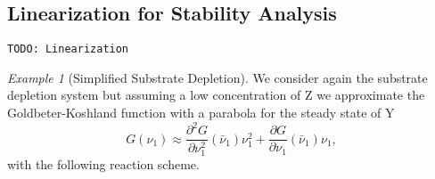 \documentclass[a4paper]{article}
\newcommand{\todo}[1]{\texttt{TODO: #1}}
\theoremstyle{plain}
\theoremstyle{definition}
\theoremstyle{remark}
\newtheorem*{example}{Example}
\begin{document}
\subsection{Linearization for Stability Analysis}

\todo{Linearization}

\begin{example}[Simplified Substrate Depletion]
  We consider again the substrate depletion system but assuming a low
  concentration of Z we approximate the Goldbeter-Koshland
  function with a parabola for the steady state of Y
  \[
    G(\nu_1)
    \approx 
    \frac{\partial^2 G}{\partial \nu_1^2}(\bar{\nu}_1) \nu_1^2 
      + \frac{\partial G}{\partial \nu_1}(\bar{\nu}_1) \nu_1,
  \]
  with the following reaction scheme.
  \begin{center}
\end{center}
\end{example}
\end{document}
